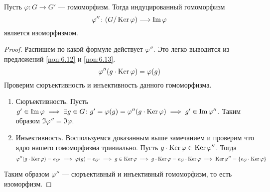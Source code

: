 \documentclass[../main.tex]{subfiles}
\begin{document}
\begin{theorem}[о гомоморфизме]
  Пусть $\varphi\colon G \to G'$ --- гомоморфизм. Тогда индуцированный гомоморфизм
  \begin{equation*}
    \varphi''\colon (G/\operatorname{Ker} \varphi) \longrightarrow \operatorname{Im} \varphi
  \end{equation*}
  является изоморфизмом.
\end{theorem}
\begin{proof}
  Распишем по какой формуле действует $\varphi''$. Это легко выводится из предложений \ref{non:6.12} и \ref{non:6.13}.
  \begin{equation*}
    \varphi''(g \cdot \operatorname{Ker} \varphi) = \varphi(g)
  \end{equation*}
  Проверим сюръективность и инъективность данного гомоморфизма.
  \begin{enumerate}
    \item Сюръективность. Пусть $g' \in \operatorname{Im} \varphi \implies \exists g \in G\colon g' = \varphi(g) = \varphi''(g \cdot \operatorname{Ker} \varphi) \implies  g' \in \operatorname{Im} \varphi''$. Таким образом $\Im \varphi'' = \Im \varphi$.
    \item Инъективность. Воспользуемся доказанным выше замечанием и проверим что ядро нашего гомоморфизма тривиально. Пусть $g \cdot \operatorname{Ker} \varphi \in \operatorname{Ker} \varphi''$. Тогда
    \begin{equation*}
    \varphi''(g \cdot \operatorname{Ker} \varphi) = e_{G'}
\implies \varphi(g) = e_{G'} \implies g \in \operatorname{Ker} \varphi \implies g \cdot \operatorname{Ker} \varphi = e_{G} \cdot \operatorname{Ker} \varphi \implies \operatorname{Ker} \varphi'' = \{e_G \cdot \operatorname{Ker} \varphi\}
    \end{equation*}
  \end{enumerate}
  Таким образом $\varphi''$ --- сюръективный и инъективный гомоморфизм, то есть изоморфизм.
\end{proof}
\end{document}
